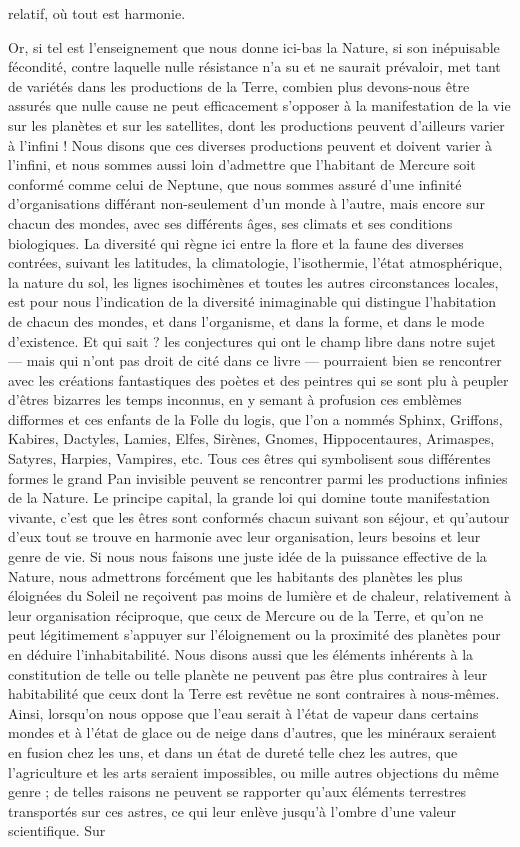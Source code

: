 \documentclass[a4paper, 11pt, oneside, landscape]{article}
\begin{document}
relatif, où tout est harmonie.

Or, si tel est l'enseignement que nous donne ici-bas la Nature, si son inépuisable fécondité, contre laquelle nulle résistance n'a su et ne saurait prévaloir, met tant de variétés dans les productions de la Terre, combien plus devons-nous être assurés que nulle cause ne peut efficacement s'opposer à la manifestation de la vie sur les planètes et sur les satellites, dont les productions peuvent d'ailleurs varier à l'infini ! Nous disons que ces diverses productions peuvent et doivent varier à l'infini, et nous sommes aussi loin d'admettre que l'habitant de Mercure soit conformé comme celui de Neptune, que nous sommes assuré d'une infinité d'organisations différant non-seulement d'un monde à l'autre, mais encore sur chacun des mondes, avec ses différents âges, ses climats et ses conditions biologiques. La diversité qui règne ici entre la flore et la faune des diverses contrées, suivant les latitudes, la climatologie, l'isothermie, l'état atmosphérique, la nature du sol, les lignes isochimènes et toutes les autres circonstances locales, est pour nous l'indication de la diversité inimaginable qui distingue l'habitation de chacun des mondes, et dans l'organisme, et dans la forme, et dans le mode d'existence. Et qui sait ? les conjectures qui ont le champ libre dans notre sujet --- mais qui n'ont pas droit de cité dans ce livre --- pourraient bien se rencontrer avec les créations fantastiques des poètes et des peintres qui se sont plu à peupler d'êtres bizarres les temps inconnus, en y semant à profusion ces emblèmes difformes et ces enfants de la Folle du logis, que l'on a nommés Sphinx, Griffons, Kabires, Dactyles, Lamies, Elfes, Sirènes, Gnomes, Hippocentaures, Arimaspes, Satyres, Harpies, Vampires, etc. Tous ces êtres qui symbolisent sous différentes formes le grand Pan invisible peuvent se rencontrer parmi les productions infinies de la Nature. Le principe capital, la grande loi qui domine toute manifestation vivante, c'est que les êtres sont conformés chacun suivant son séjour, et qu'autour d'eux tout se trouve en harmonie avec leur organisation, leurs besoins et leur genre de vie. Si nous nous faisons une juste idée de la puissance effective de la Nature, nous admettrons forcément que les habitants des planètes les plus éloignées du Soleil ne reçoivent pas moins de lumière et de chaleur, relativement à leur organisation réciproque, que ceux de Mercure ou de la Terre, et qu'on ne peut légitimement s'appuyer sur l'éloignement ou la proximité des planètes pour en déduire l'inhabitabilité. Nous disons aussi que les éléments inhérents à la constitution de telle ou telle planète ne peuvent pas être plus contraires à leur habitabilité que ceux dont la Terre est revêtue ne sont contraires à nous-mêmes. Ainsi, lorsqu'on nous oppose que l'eau serait à l'état de vapeur dans certains mondes et à l'état de glace ou de neige dans d'autres, que les minéraux seraient en fusion chez les uns, et dans un état de dureté telle chez les autres, que l'agriculture et les arts seraient impossibles, ou mille autres objections du même genre ; de telles raisons ne peuvent se rapporter qu'aux éléments terrestres transportés sur ces astres, ce qui leur enlève jusqu'à l'ombre d'une valeur scientifique. Sur 
\end{document}
